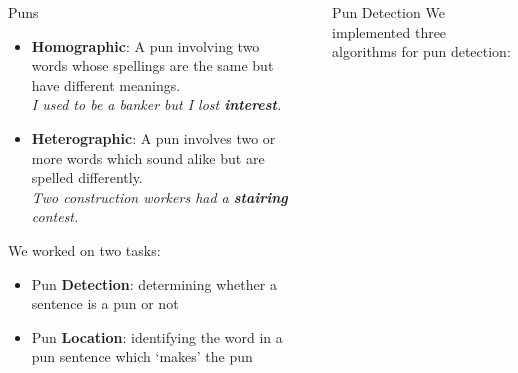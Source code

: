 \documentclass[final]{beamer}
\newlength{\sepwid}
\newlength{\onecolwid}
\newlength{\twocolwid}
\begin{document}
\begin{frame}[t]
\begin{columns}[t]
\begin{column}{\onecolwid}
\begin{block}{Puns}
{					\begin{itemize}
						\item {\textbf{Homographic}: A pun involving two words whose spellings are the same but have different meanings.\\
								\textit{I used to be a banker but I lost \textbf{interest}.}}
						\item {\textbf{Heterographic}: A pun involves two or more words which sound alike but are spelled differently.\\
								\textit{Two construction workers had a \textbf{stairing} contest.}}
					\end{itemize}
					\vspace{40mm}
					We worked on two tasks: 
					\begin{itemize}
						\item {Pun \textbf{Detection}: determining whether a sentence is a pun or not}
						\item {Pun \textbf{Location}: identifying the word in a pun sentence which `makes' the pun}
					\end{itemize}
				}
			\end{block}
		\end{column}
		\begin{column}{\sepwid}\end{column} %
		\begin{column}{\twocolwid}
			\begin{columns}[t,totalwidth=\twocolwid] %
				\begin{column}{\onecolwid}\vspace{-.6in}
					\vspace{60mm}
					\begin{block}{Pun Detection}
						{\large 
							We implemented three algorithms for pun detection:
}
\end{block}
\end{column}
\end{columns}
\end{column}
\end{columns}
\end{frame}
\end{document}
